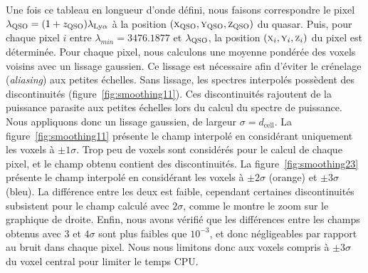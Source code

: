 Une fois ce tableau en longueur d'onde défini, nous faisons correspondre le pixel $\lambda_{\textsc{QSO}} = (1+z_{\textsc{QSO}}) \lambda_{\mathrm{Ly}\alpha}$ à la position $(\textsc{x}_{\textsc{QSO}}, \textsc{y}_{\textsc{QSO}}, \textsc{z}_{\textsc{QSO}})$ du quasar.
Puis, pour chaque pixel $i$ entre $\lambda_{min} = \num{3476.1877}$ et $\lambda_{\textsc{QSO}}$, la position $(\textsc{x}_i, \textsc{y}_i, \textsc{z}_i)$ du pixel est déterminée.
Pour chaque pixel, nous calculons une moyenne pondérée des voxels voisins avec un lissage gaussien.
  Ce lissage est nécessaire afin d'éviter le crénelage (\emph{aliasing}) aux petites échelles.
  Sans lissage, les spectres interpolés possèdent des discontinuités (figure~\ref{fig:smoothing11}). Ces discontinuités rajoutent de la puissance parasite aux petites échelles lors du calcul du spectre de puissance.
  Nous appliquons donc un lissage gaussien, de largeur $\sigma = d_{\mathrm{cell}}$.
La figure~\ref{fig:smoothing11} présente le champ interpolé en considérant uniquement les voxels à $\pm 1 \sigma$. Trop peu de voxels sont considérés pour le calcul de chaque pixel, et le champ obtenu contient des discontinuités. La figure~\ref{fig:smoothing23} présente le champ interpolé en considérant les voxels à $\pm 2 \sigma$ (orange) et $\pm 3 \sigma$ (bleu). La différence entre les deux est faible, cependant certaines discontinuités subsistent pour le champ calculé avec $2 \sigma$, comme le montre le zoom sur le graphique de droite. Enfin, nous avons vérifié que les différences entre les champs obtenus avec $3$ et $4 \sigma$ sont plus faibles que $10^{-3}$, et donc négligeables par rapport au bruit dans chaque pixel. Nous nous limitons donc aux voxels compris à $\pm 3 \sigma$ du voxel central pour limiter le temps CPU.
